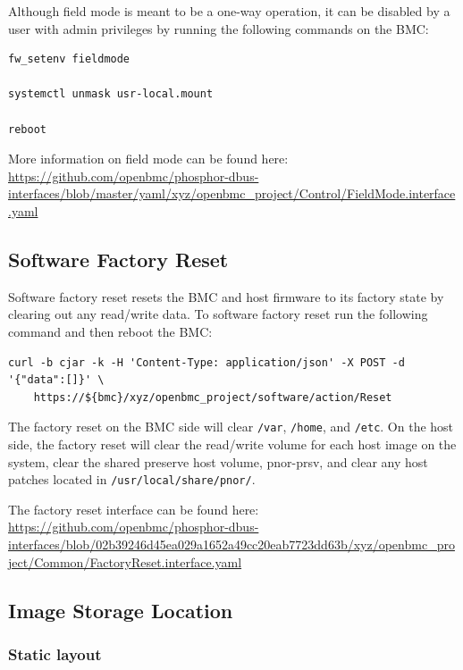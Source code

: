 Although field mode is meant to be a one-way operation, it can be
disabled by a user with admin privileges by running the following
commands on the BMC:

\begin{verbatim}
fw_setenv fieldmode

systemctl unmask usr-local.mount

reboot
\end{verbatim}

More information on field mode can be found here:
\url{https://github.com/openbmc/phosphor-dbus-interfaces/blob/master/yaml/xyz/openbmc_project/Control/FieldMode.interface.yaml}

\hypertarget{software-factory-reset}{%
\subsection{Software Factory Reset}\label{software-factory-reset}}

Software factory reset resets the BMC and host firmware to its factory
state by clearing out any read/write data. To software factory reset run
the following command and then reboot the BMC:

\begin{verbatim}
curl -b cjar -k -H 'Content-Type: application/json' -X POST -d '{"data":[]}' \
    https://${bmc}/xyz/openbmc_project/software/action/Reset
\end{verbatim}

The factory reset on the BMC side will clear \texttt{/var},
\texttt{/home}, and \texttt{/etc}. On the host side, the factory reset
will clear the read/write volume for each host image on the system,
clear the shared preserve host volume, pnor-prsv, and clear any host
patches located in \texttt{/usr/local/share/pnor/}.

The factory reset interface can be found here:
\url{https://github.com/openbmc/phosphor-dbus-interfaces/blob/02b39246d45ea029a1652a49cc20eab7723dd63b/xyz/openbmc_project/Common/FactoryReset.interface.yaml}

\hypertarget{image-storage-location}{%
\subsection{Image Storage Location}\label{image-storage-location}}

\hypertarget{static-layout}{%
\subsubsection{Static layout}\label{static-layout}}

